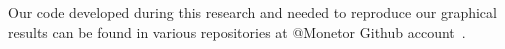 Our code developed during this research and needed to reproduce our graphical results can be found in various repositories at @Monetor Github account~\cite{monetor-github}.